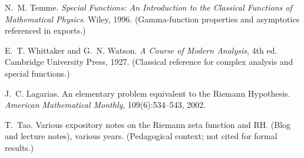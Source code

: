 \documentclass[11pt]{article}
\theoremstyle{plain}
\theoremstyle{definition}
\begin{document}
\begin{thebibliography}{99}
N.~M. Temme.
\newblock \emph{Special Functions: An Introduction to the Classical Functions of Mathematical Physics}.
\newblock Wiley, 1996.
\newblock (Gamma-function properties and asymptotics referenced in exports.)

E.~T. Whittaker and G.~N. Watson.
\newblock \emph{A Course of Modern Analysis}, 4th ed.
\newblock Cambridge University Press, 1927.
\newblock (Classical reference for complex analysis and special functions.)

J.~C. Lagarias.
\newblock An elementary problem equivalent to the Riemann Hypothesis.
\newblock \emph{American Mathematical Monthly}, 109(6):534--543, 2002.

T.~Tao.
\newblock Various expository notes on the Riemann zeta function and RH.
\newblock (Blog and lecture notes), various years.
\newblock (Pedagogical context; not cited for formal results.)

\end{thebibliography}
\end{document}
